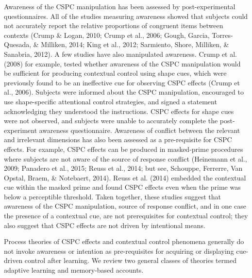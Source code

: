 \documentclass[english,,man,floatsintext]{apa6}
\begin{document}
Awareness of the CSPC manipulation has been assessed by
post-experimental questionnaires. All of the studies measuring awareness
showed that subjects could not accurately report the relative
proportions of congruent items between contexts (Crump \& Logan, 2010;
Crump et al., 2006; Gough, Garcia, Torres-Quesada, \& Milliken, 2014;
King et al., 2012; Sarmiento, Shore, Milliken, \& Sanabria, 2012). A few
studies have also manipulated awareness. Crump et al. (2008) for
example, tested whether awareness of the CSPC manipulation would be
sufficient for producing contextual control using shape cues, which were
previously found to be an ineffective cue for observing CSPC effects
(Crump et al., 2006). Subjects were informed about the CSPC
manipulation, encouraged to use shape-specific attentional control
strategies, and signed a statement acknowledging they understood the
instructions. CSPC effects for shape cues were not observed, and
subjects were unable to accurately complete the post-experiment
awareness questionnaire. Awareness of conflict between the relevant and
irrelevant dimensions has also been assessed as a pre-requisite for CSPC
effects. For example, CSPC effects can be produced in masked-prime
procedures where subjects are not aware of the source of response
conflict (Heinemann et al., 2009; Panadero et al., 2015; Reuss et al.,
2014; but see, Schouppe, Ferrerre, Van Opstal, Braem, \& Notebaert,
2014). Reuss et al. (2014) embedded the contextual cue within the masked
prime and found CSPC effects even when the prime was below a perceptible
threshold. Taken together, these studies suggest that awareness of the
CSPC manipulation, source of response conflict, and in one case the
presence of a contextual cue, are not prerequisites for contextual
control; they also suggest that CSPC effects are not driven by
intentional means.

Process theories of CSPC effects and contextual control phenomena
generally do not invoke awareness or intention as pre-requisites for
acquiring or displaying cue-driven control after learning. We review two
general classes of theories termed adaptive learning and memory-based
accounts.
\end{document}
